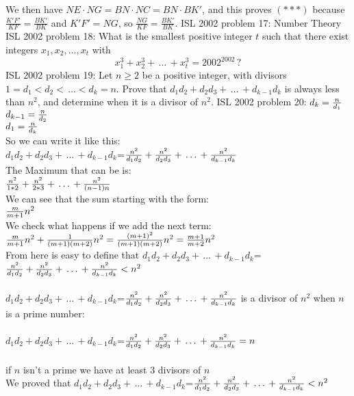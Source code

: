 We then have $NE\cdot NG=BN\cdot NC=BN\cdot BK'$, and this proves $(***)$ because $\frac{K'F'}{KF}=\frac{BK'}{BK}$ and $K'F'=NG$, so $\frac{NG}{KF}=\frac{BK'}{BK}$. 
ISL 2002 problem 17:  Number Theory 
ISL 2002 problem 18:  What is the smallest positive integer $t$ such that there exist integers $x_1,x_2,\ldots,x_t$ with
\[ x^3_1+x^3_2+\,\ldots\,+x^3_t=2002^{2002}\,? \] 
ISL 2002 problem 19:  Let $n\geq2$ be a positive integer, with divisors $1=d_1<d_2<\,\ldots<d_k=n$.  Prove that $d_1d_2+d_2d_3+\,\ldots\,+d_{k-1}d_k$ is always less than $n^2$, and determine when it is a divisor of $n^2$. 
ISL 2002 problem 20:  $d_k = {n\over d_1}$ \\
$d_{k-1} = {n\over d_2}$ \\
$d_1 = {n\over d_k}$ \\
So we can write it like this: \\
$d_1d_2+d_2d_3+\,\ldots\,+d_{k-1}d_k$=${{n^2}\over d_1d_2}+{{n^2}\over d_2d_3}+\,\ldots\,+{{n^2}\over d_{k-1}d_k}$ \\
The Maximum that can be is: \\
${{n^2}\over 1*2}+{{n^2}\over 2*3}+\,\ldots\,+{{n^2}\over (n-1)n}$ \\
We can see that the sum starting with the form: \\
${m\over {m+1}}{n^2}$ \\
We check what happens if we add the next term: \\
${m\over {m+1}}{n^2} + {1\over {(m+1)(m+2)}}{n^2} = {{(m+1)^2}\over {(m+1)(m+2)}}{n^2} = {{m+1}\over {m+2}}{n^2}$ \\
From here is easy to define that $d_1d_2+d_2d_3+\,\ldots\,+d_{k-1}d_k$=${{n^2}\over d_1d_2}+{{n^2}\over d_2d_3}+\,\ldots\,+{{n^2}\over d_{k-1}d_k}<{n^2}$ \\\\
$d_1d_2+d_2d_3+\,\ldots\,+d_{k-1}d_k$=${{n^2}\over d_1d_2}+{{n^2}\over d_2d_3}+\,\ldots\,+{{n^2}\over d_{k-1}d_k}$ is a divisor of ${n^2}$ when $n$ is a prime number: \\\\
$d_1d_2+d_2d_3+\,\ldots\,+d_{k-1}d_k$=${{n^2}\over d_1d_2}+{{n^2}\over d_2d_3}+\,\ldots\,+{{n^2}\over d_{k-1}d_k} = n$ \\\\
if $n$ isn't a prime we have at least 3 divisors of $n$ \\
We proved that $d_1d_2+d_2d_3+\,\ldots\,+d_{k-1}d_k$=${{n^2}\over d_1d_2}+{{n^2}\over d_2d_3}+\,\ldots\,+{{n^2}\over d_{k-1}d_k}<{n^2}$ \\\\
